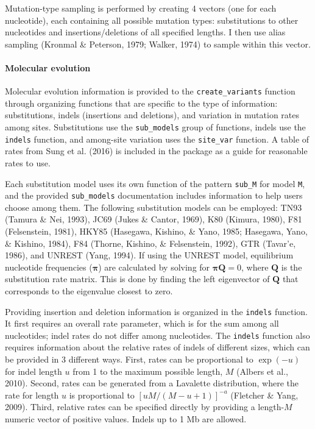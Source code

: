 \documentclass[12pt,]{article}
\let\oldparagraph\paragraph
\renewcommand{\paragraph}[1]{\oldparagraph{#1}\mbox{}}
\begin{document}
Mutation-type sampling is performed by creating 4 vectors (one for each nucleotide),
each containing all possible mutation types:
substitutions to other nucleotides and insertions/deletions of all specified lengths.
I then use alias sampling
(Kronmal \& Peterson, 1979; Walker, 1974)
to sample within this vector.

\hypertarget{molecular-evolution}{%
\paragraph{Molecular evolution}\label{molecular-evolution}}

Molecular evolution information is provided to the \texttt{create\_variants}
function through organizing functions that are specific to the type of information:
substitutions, indels (insertions and deletions),
and variation in mutation rates among sites.
Substitutions use the \texttt{sub\_models} group of functions,
indels use the \texttt{indels} function,
and among-site variation uses the \texttt{site\_var} function.
A table of rates from Sung et al. (2016) is included in the package
as a guide for reasonable rates to use.

Each substitution model uses its own function of the pattern \texttt{sub\_M} for model \texttt{M},
and the provided \texttt{sub\_models} documentation includes information to help
users choose among them.
The following substitution models can be employed:
TN93 (Tamura \& Nei, 1993),
JC69 (Jukes \& Cantor, 1969),
K80 (Kimura, 1980),
F81 (Felsenstein, 1981),
HKY85 (Hasegawa, Kishino, \& Yano, 1985; Hasegawa, Yano, \& Kishino, 1984),
F84 (Thorne, Kishino, \& Felsenstein, 1992),
GTR (Tavar\a'e, 1986),
and UNREST (Yang, 1994).
If using the UNREST model, equilibrium nucleotide frequencies (\(\mathbf{\pi}\)) are
calculated by solving for \(\mathbf{\pi} \mathbf{Q} = 0\), where \(\mathbf{Q}\) is the
substitution rate matrix.
This is done by finding the left eigenvector of \(\mathbf{Q}\) that
corresponds to the eigenvalue closest to zero.

Providing insertion and deletion information is organized in the \texttt{indels} function.
It first requires an overall rate parameter, which is for the sum among all
nucleotides; indel rates do not differ among nucleotides.
The \texttt{indels} function also requires information about the relative rates of
indels of different sizes, which can be provided in 3 different ways.
First, rates can be proportional to \(\exp(-u)\) for indel length \(u\) from
1 to the maximum possible length, \(M\) (Albers et al., 2010).
Second, rates can be generated from a Lavalette distribution,
where the rate for length \(u\) is proportional to
\(\left[{u M / (M - u + 1)}\right]^{-a}\) (Fletcher \& Yang, 2009).
Third, relative rates can be specified directly by providing a length-\(M\)
numeric vector of positive values.
Indels up to 1 Mb are allowed.
\end{document}
